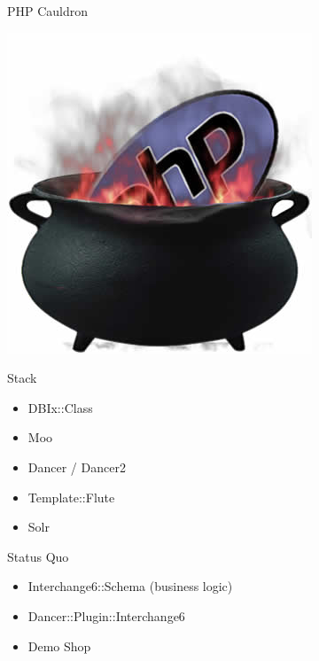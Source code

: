 \begin{frame}{PHP Cauldron}
  \begin{center}
    \includegraphics[width=\textwidth,height=0.8\textheight,keepaspectratio]{images/cauldron.jpg}
  \end{center}
\end{frame}

\begin{frame}{Stack}
  \begin{itemize}
  \item DBIx::Class
  \item Moo
  \item Dancer / Dancer2
  \item Template::Flute
  \item Solr
  \end{itemize}
\end{frame}

\begin{frame}{Status Quo}
\begin{itemize}
\item Interchange6::Schema (business logic)
\item Dancer::Plugin::Interchange6
\item Demo Shop
\end{itemize}
\end{frame}


